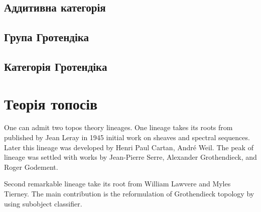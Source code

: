 \subsection{Аддитивна категорія}


\subsection{Група Гротендіка}

\subsection{Категорія Гротендіка}

\section{Теорія топосів}

One can admit two topos theory lineages. One lineage takes its roots from published
by Jean Leray in 1945 initial work on sheaves and spectral sequences. Later this lineage
was developed by Henri Paul Cartan, André Weil. The peak of lineage was settled
with works by Jean-Pierre Serre, Alexander Grothendieck, and Roger Godement.

Second remarkable lineage take its root from William Lawvere and
Myles Tierney. The main contribution is the reformulation of Grothendieck topology
by using subobject classifier.

